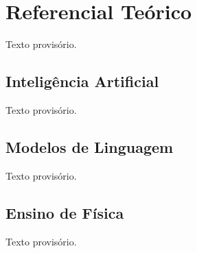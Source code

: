 \chapter{Referencial Teórico}

Texto provisório.

\section{Inteligência Artificial}

Texto provisório.

\section{Modelos de Linguagem}

Texto provisório.

\section{Ensino de Física}

Texto provisório.

